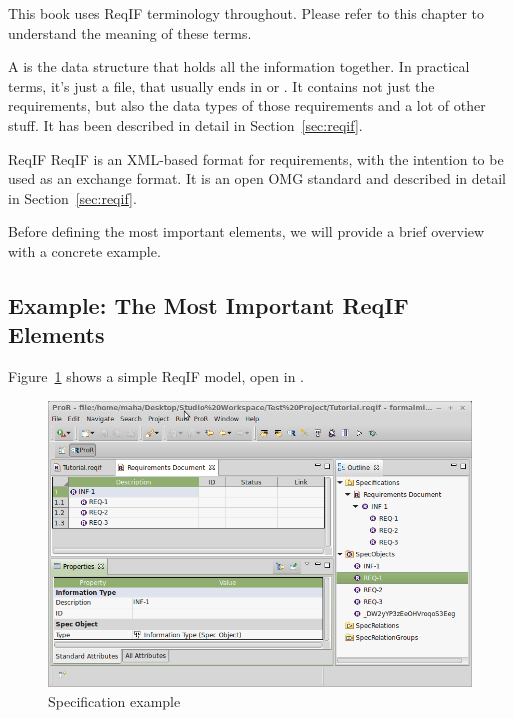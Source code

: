 \begin{info}
This book uses ReqIF terminology throughout.  Please refer to this chapter to understand the meaning of these terms.
\end{info}

A  is the data structure that holds all the information together.  In practical terms, it's just a file, that usually ends in  or .  It contains not just the requirements, but also the data types of those requirements and a lot of other stuff.  It has been described in detail in Section~\ref{sec:reqif}.

\begin{definition}{ReqIF}
ReqIF is an XML-based format for requirements, with the intention to be used as an exchange format.  It is an open OMG standard and described in detail in Section~\ref{sec:reqif}.
\end{definition}

Before defining the most important elements, we will provide a brief overview with a concrete example.

\subsection{Example: The Most Important ReqIF Elements}

Figure~\ref{fig:spec_example} shows a simple ReqIF model, open in \pror{}.  

\begin{figure}[H]
  \centering
  \includegraphics[width=\textwidth]{../rmf-images/screenshot_INF_1.png}
  \caption{Specification example}
  \label{fig:spec_example}
\end{figure}

